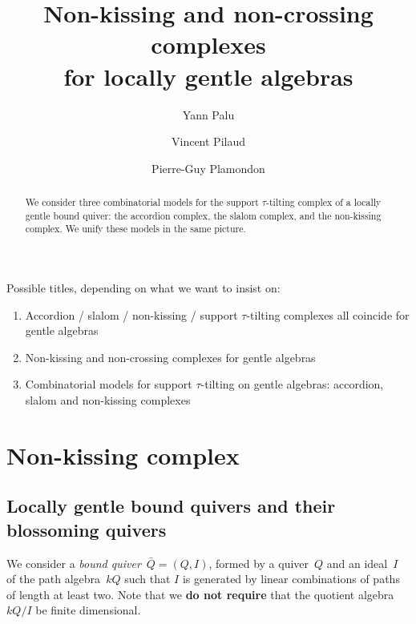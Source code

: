 \documentclass{amsart}
\title[Non-kissing and non-crossing complexes for locally gentle algebras]{Non-kissing and non-crossing complexes \\ for locally gentle algebras}
\author{Yann Palu}
\author{Vincent Pilaud}
\author{Pierre-Guy Plamondon}
\theoremstyle{definition}
\newcommand{\darkblue}{\color{darkblue}} %
\newcommand{\defn}[1]{\textsl{\darkblue #1}} %
\begin{document}
\begin{abstract}
We consider three combinatorial models for the support $\tau$-tilting complex of a locally gentle bound quiver: the accordion complex, the slalom complex, and the non-kissing complex. We unify these models in the same picture.
\end{abstract}


\maketitle

Possible titles, depending on what we want to insist on:
\begin{enumerate}
\item Accordion / slalom / non-kissing / support $\tau$-tilting complexes all coincide for gentle algebras
\item Non-kissing and non-crossing complexes for gentle algebras
\item Combinatorial models for support $\tau$-tilting on gentle algebras: accordion, slalom and non-kissing complexes
\end{enumerate}


\section{Non-kissing complex}

\subsection{Locally gentle bound quivers and their blossoming quivers}

We consider a \defn{bound quiver}~$\bar Q = (Q,I)$, formed by a quiver~$Q$ and an ideal~$I$ of the path algebra~$kQ$ such that $I$ is generated by linear combinations of paths of length at least two.
Note that we \textbf{do not require} that the quotient algebra~$kQ/I$ be finite dimensional.
\end{document}
